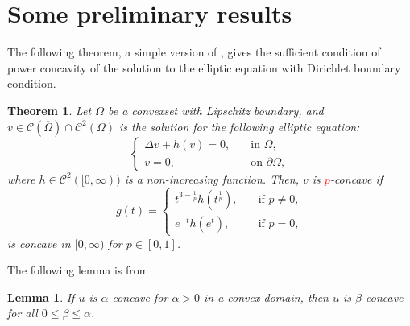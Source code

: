 \documentclass[10pt]{article}         %
\newcommand{\red}{\textcolor{red}}
\newtheorem{theorem}{Theorem}[section]
\newtheorem{lemma}{Lemma}[section]
\numberwithin{equation}{section}
\begin{document}
\section{Some preliminary results} 
The following theorem, a simple version of \cite{BS2013},  gives the sufficient condition of  power concavity of the solution to the elliptic equation with Dirichlet boundary condition. 
\begin{theorem}\label{ect}
 Let $\Omega$ be a convexset with Lipschitz boundary, and $ v\in \mathcal{C}(\overline{\Omega})\cap\mathcal{C}^2(\Omega)$ is the solution for the following elliptic equation:
 \[\begin{cases}
  \Delta v+ h(v)=0,\quad&\text{in }\Omega,\\
  v=0,\quad&\text{on }\partial\Omega,
 \end{cases}\]
 where $h\in \mathcal{C}^2([0,\infty))$ is a non-increasing function. Then, $v$ is {\red{$p$}}-concave if $$g(t)=\begin{cases}
 t^{3-\frac{1}{p}}h(t^{\frac{1}{p}}),\quad &\text{if }p\neq0,\\
 e^{-t}h(e^t),\quad &\text{if }p=0,
 \end{cases}$$
 is concave in $[0,\infty)$ for $p\in[0,1]$.
\end{theorem}
The following lemma is from \cite[Property 2]{KA1985}



\begin{lemma}\label{cam} If $u$ is $\alpha$-concave for $\alpha>0$ in a convex domain, then $u$ is $\beta$-concave for all $0\leq \beta\leq \alpha$.
\end{lemma}
\end{document}

